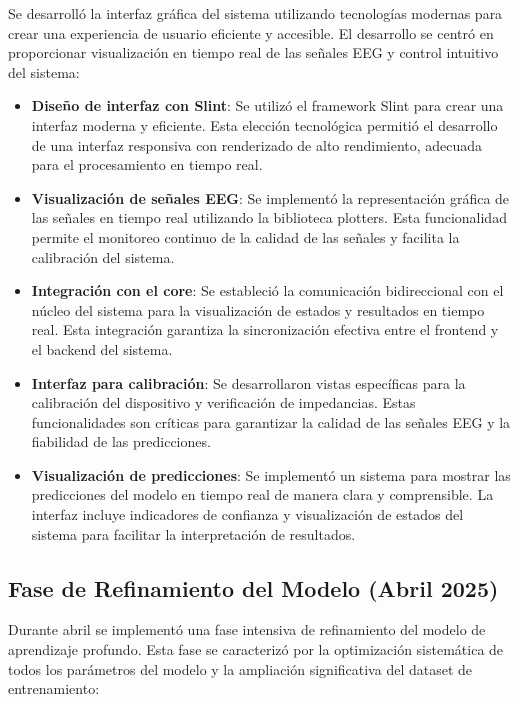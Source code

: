 Se desarrolló la interfaz gráfica del sistema utilizando tecnologías modernas para crear una experiencia de usuario eficiente y accesible. El desarrollo se centró en proporcionar visualización en tiempo real de las señales EEG y control intuitivo del sistema:

\begin{itemize}
    \item \textbf{Diseño de interfaz con Slint}: Se utilizó el framework Slint para crear una interfaz moderna y eficiente. Esta elección tecnológica permitió el desarrollo de una interfaz responsiva con renderizado de alto rendimiento, adecuada para el procesamiento en tiempo real.
    
    \item \textbf{Visualización de señales EEG}: Se implementó la representación gráfica de las señales en tiempo real utilizando la biblioteca plotters. Esta funcionalidad permite el monitoreo continuo de la calidad de las señales y facilita la calibración del sistema.
    
    \item \textbf{Integración con el core}: Se estableció la comunicación bidireccional con el núcleo del sistema para la visualización de estados y resultados en tiempo real. Esta integración garantiza la sincronización efectiva entre el frontend y el backend del sistema.
    
    \item \textbf{Interfaz para calibración}: Se desarrollaron vistas específicas para la calibración del dispositivo y verificación de impedancias. Estas funcionalidades son críticas para garantizar la calidad de las señales EEG y la fiabilidad de las predicciones.
    
    \item \textbf{Visualización de predicciones}: Se implementó un sistema para mostrar las predicciones del modelo en tiempo real de manera clara y comprensible. La interfaz incluye indicadores de confianza y visualización de estados del sistema para facilitar la interpretación de resultados.
\end{itemize}

\subsection{Fase de Refinamiento del Modelo (Abril 2025)}

Durante abril se implementó una fase intensiva de refinamiento del modelo de aprendizaje profundo. Esta fase se caracterizó por la optimización sistemática de todos los parámetros del modelo y la ampliación significativa del dataset de entrenamiento:

